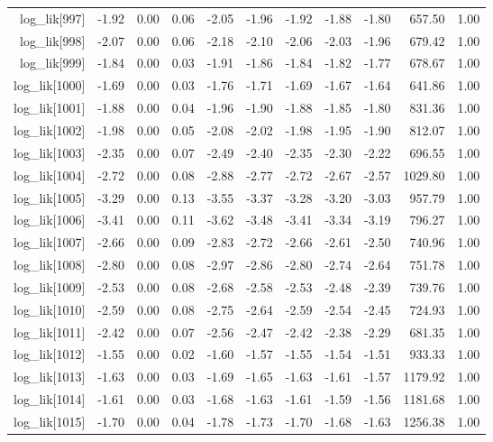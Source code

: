 \begin{table}[ht]
\begin{tabular}{rrrrrrrrrrr}
  log\_lik[997] & -1.92 & 0.00 & 0.06 & -2.05 & -1.96 & -1.92 & -1.88 & -1.80 & 657.50 & 1.00 \\ 
  log\_lik[998] & -2.07 & 0.00 & 0.06 & -2.18 & -2.10 & -2.06 & -2.03 & -1.96 & 679.42 & 1.00 \\ 
  log\_lik[999] & -1.84 & 0.00 & 0.03 & -1.91 & -1.86 & -1.84 & -1.82 & -1.77 & 678.67 & 1.00 \\ 
  log\_lik[1000] & -1.69 & 0.00 & 0.03 & -1.76 & -1.71 & -1.69 & -1.67 & -1.64 & 641.86 & 1.00 \\ 
  log\_lik[1001] & -1.88 & 0.00 & 0.04 & -1.96 & -1.90 & -1.88 & -1.85 & -1.80 & 831.36 & 1.00 \\ 
  log\_lik[1002] & -1.98 & 0.00 & 0.05 & -2.08 & -2.02 & -1.98 & -1.95 & -1.90 & 812.07 & 1.00 \\ 
  log\_lik[1003] & -2.35 & 0.00 & 0.07 & -2.49 & -2.40 & -2.35 & -2.30 & -2.22 & 696.55 & 1.00 \\ 
  log\_lik[1004] & -2.72 & 0.00 & 0.08 & -2.88 & -2.77 & -2.72 & -2.67 & -2.57 & 1029.80 & 1.00 \\ 
  log\_lik[1005] & -3.29 & 0.00 & 0.13 & -3.55 & -3.37 & -3.28 & -3.20 & -3.03 & 957.79 & 1.00 \\ 
  log\_lik[1006] & -3.41 & 0.00 & 0.11 & -3.62 & -3.48 & -3.41 & -3.34 & -3.19 & 796.27 & 1.00 \\ 
  log\_lik[1007] & -2.66 & 0.00 & 0.09 & -2.83 & -2.72 & -2.66 & -2.61 & -2.50 & 740.96 & 1.00 \\ 
  log\_lik[1008] & -2.80 & 0.00 & 0.08 & -2.97 & -2.86 & -2.80 & -2.74 & -2.64 & 751.78 & 1.00 \\ 
  log\_lik[1009] & -2.53 & 0.00 & 0.08 & -2.68 & -2.58 & -2.53 & -2.48 & -2.39 & 739.76 & 1.00 \\ 
  log\_lik[1010] & -2.59 & 0.00 & 0.08 & -2.75 & -2.64 & -2.59 & -2.54 & -2.45 & 724.93 & 1.00 \\ 
  log\_lik[1011] & -2.42 & 0.00 & 0.07 & -2.56 & -2.47 & -2.42 & -2.38 & -2.29 & 681.35 & 1.00 \\ 
  log\_lik[1012] & -1.55 & 0.00 & 0.02 & -1.60 & -1.57 & -1.55 & -1.54 & -1.51 & 933.33 & 1.00 \\ 
  log\_lik[1013] & -1.63 & 0.00 & 0.03 & -1.69 & -1.65 & -1.63 & -1.61 & -1.57 & 1179.92 & 1.00 \\ 
  log\_lik[1014] & -1.61 & 0.00 & 0.03 & -1.68 & -1.63 & -1.61 & -1.59 & -1.56 & 1181.68 & 1.00 \\ 
  log\_lik[1015] & -1.70 & 0.00 & 0.04 & -1.78 & -1.73 & -1.70 & -1.68 & -1.63 & 1256.38 & 1.00 \\ 

\end{tabular}
\end{table}
